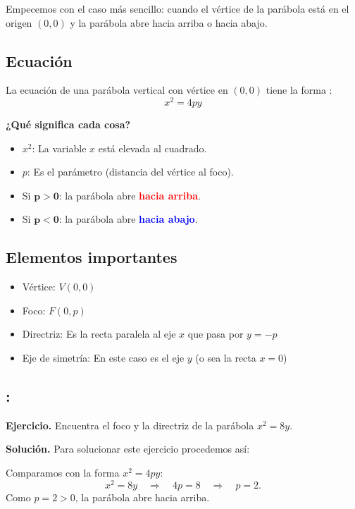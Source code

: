 \documentclass[12pt,a4paper]{article}
\begin{document}
	Empecemos con el caso más sencillo: cuando el vértice de la parábola está en el origen \((0,0)\) y la parábola abre hacia arriba o hacia abajo.

	\subsection*{Ecuación}

	La ecuación de una parábola vertical con vértice en \((0,0)\) tiene la forma :
	\[
	\boxed{x^2=4py}
	\]

	\textbf{¿Qué significa cada cosa?}
	\begin{itemize}
		\item \(x^2\): La variable \(x\) está elevada al cuadrado.
		\item \(p\): Es el parámetro (distancia del vértice al foco).
		\item Si \(\mathbf{p>0}\): la parábola abre \textcolor{red}{\textbf{hacia arriba}}.
		\item Si \(\mathbf{p<0}\): la parábola abre \textcolor{blue}{\textbf{hacia abajo}}.
	\end{itemize}

	\subsection*{Elementos importantes}
	\begin{itemize}
		\item Vértice: \(V(0,0)\)
		\item Foco: \(F(0,p)\)
		\item Directriz: Es la recta paralela al eje $x$ que pasa por \(y=-p\)
		\item Eje de simetría: En este caso es el eje \(y\) (o sea la recta \(x=0\))
	\end{itemize}

	\subsection*{{\color{blue!50!red}{Ejemplo 1}}: \color{blue!80!black}{Parábola que abre hacia arriba}}

	\textbf{Ejercicio.} Encuentra el foco y la directriz de la parábola \(x^2=8y\).

	\bigskip

	\textbf{Solución.} Para solucionar este ejercicio procedemos así:
	
	\bigskip
	
	Comparamos con la forma \(x^2=4py\):
	\[
	x^2=8y \quad\Rightarrow\quad 4p=8 \quad\Rightarrow\quad p=2.
	\]
	Como \(p=2>0\), la parábola abre hacia arriba.
\end{document}
